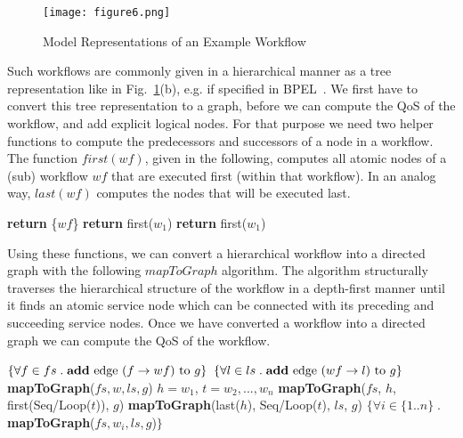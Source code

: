 \documentclass[10pt, conference, compsocconf]{IEEEtran}
\newcommand{\oneImage}{3.2in}
\begin{document}
\begin{figure}[htb!]
	\centering
	\texttt{[image: figure6.png]}
	\caption{Model Representations of an Example Workflow}
	\label{fig:representations}
\end{figure}

\noindent Such workflows are commonly given in a hierarchical manner
  as a tree representation like in Fig.~\ref{fig:representations}(b), e.g. if specified in BPEL~\cite{BPEL2006}.
We first have to convert this tree representation to a graph, before we can compute the QoS of the workflow,
	and add explicit logical nodes.
For that purpose we need two helper functions
	to compute the predecessors and successors of a node in a workflow.
The function $first(wf)$, given in the following, computes all atomic nodes of a (sub) workflow $wf$ that are executed first (within that workflow).
In an analog way, $last(wf)$ computes the nodes that will be executed last.

\begin{algorithm}
	\label{algo:first}
	\begin{algorithmic}[1]
				\State \textbf{return} \{$wf$\}
				\State \textbf{return} first($w_1$)
				\State \textbf{return} first($w_1$)
			\EndIf
		\EndProcedure
	\end{algorithmic}
\end{algorithm}

\noindent Using these functions, we can convert a hierarchical workflow into a directed graph with the following $mapToGraph$ algorithm.
The algorithm structurally traverses the hierarchical structure of the workflow 
	in a depth-first manner until it finds an atomic service node which can be connected with its preceding and succeeding service nodes.
Once we have converted a workflow into a directed graph we can compute the QoS of the workflow.

\begin{algorithm}
	\label{algo:mapToGraph}
	\begin{algorithmic}[1]
				\State $\{\forall f \in fs \; . \; \mbox{\textbf{add} edge } (f \rightarrow wf) \mbox{ to } g \}$
	    	\State $\{\forall l \in ls \; . \; \mbox{\textbf{add} edge } (wf \rightarrow l) \mbox{ to } g \}$
				\State \textbf{mapToGraph}($fs, w, ls, g$)
				\State $h = w_1$, $t = w_2,...,w_n$
	      \State \textbf{mapToGraph}($fs$, $h$, first(Seq/Loop($t$)), $g$)
	      \State \textbf{mapToGraph}(last($h$), Seq/Loop($t$), $ls$, $g$)
				\State $\{\forall i \in \{1..n\} \; . \; $\textbf{mapToGraph}($fs, w_i, ls, g$)$ \}$
			\EndIf
		\EndProcedure
	\end{algorithmic}
\end{algorithm}
\end{document}
